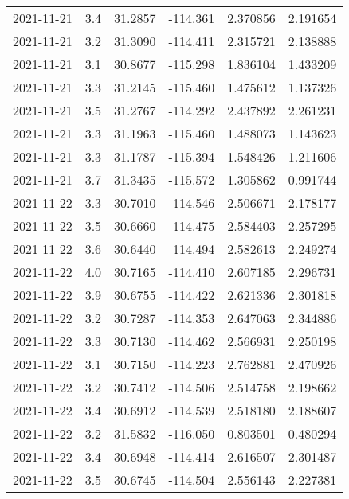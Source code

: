 \begin{tabular}{lrrrrr}
2021-11-21 &       3.4 &  31.2857 &  -114.361 &         2.370856 &         2.191654 \\
2021-11-21 &       3.2 &  31.3090 &  -114.411 &         2.315721 &         2.138888 \\
2021-11-21 &       3.1 &  30.8677 &  -115.298 &         1.836104 &         1.433209 \\
2021-11-21 &       3.3 &  31.2145 &  -115.460 &         1.475612 &         1.137326 \\
2021-11-21 &       3.5 &  31.2767 &  -114.292 &         2.437892 &         2.261231 \\
2021-11-21 &       3.3 &  31.1963 &  -115.460 &         1.488073 &         1.143623 \\
2021-11-21 &       3.3 &  31.1787 &  -115.394 &         1.548426 &         1.211606 \\
2021-11-21 &       3.7 &  31.3435 &  -115.572 &         1.305862 &         0.991744 \\
2021-11-22 &       3.3 &  30.7010 &  -114.546 &         2.506671 &         2.178177 \\
2021-11-22 &       3.5 &  30.6660 &  -114.475 &         2.584403 &         2.257295 \\
2021-11-22 &       3.6 &  30.6440 &  -114.494 &         2.582613 &         2.249274 \\
2021-11-22 &       4.0 &  30.7165 &  -114.410 &         2.607185 &         2.296731 \\
2021-11-22 &       3.9 &  30.6755 &  -114.422 &         2.621336 &         2.301818 \\
2021-11-22 &       3.2 &  30.7287 &  -114.353 &         2.647063 &         2.344886 \\
2021-11-22 &       3.3 &  30.7130 &  -114.462 &         2.566931 &         2.250198 \\
2021-11-22 &       3.1 &  30.7150 &  -114.223 &         2.762881 &         2.470926 \\
2021-11-22 &       3.2 &  30.7412 &  -114.506 &         2.514758 &         2.198662 \\
2021-11-22 &       3.4 &  30.6912 &  -114.539 &         2.518180 &         2.188607 \\
2021-11-22 &       3.2 &  31.5832 &  -116.050 &         0.803501 &         0.480294 \\
2021-11-22 &       3.4 &  30.6948 &  -114.414 &         2.616507 &         2.301487 \\
2021-11-22 &       3.5 &  30.6745 &  -114.504 &         2.556143 &         2.227381 \\

\end{tabular}
